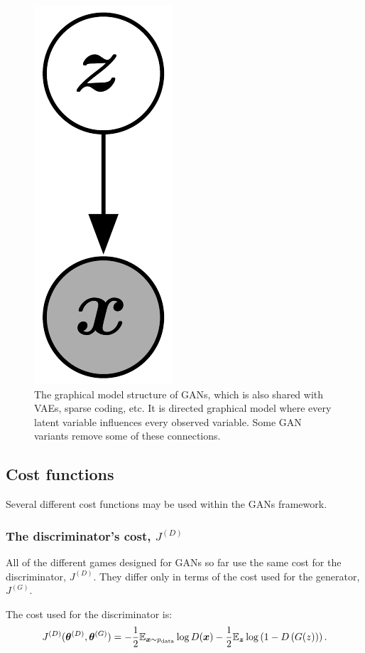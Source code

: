 \begin{figure}
  \centering
  \includegraphics{graph}
  \caption{The graphical model structure of GANs, which is also shared with
    VAEs, sparse coding, etc.
    It is directed graphical model where every latent variable influences
    every observed variable.
    Some GAN variants remove some of these connections.
  }
  \label{fig:graph}
\end{figure}

\subsection{Cost functions}

Several different cost functions may be used within the GANs framework.

\subsubsection{The discriminator's cost, $J^{(D)}$}

All of the different games designed for GANs so far use the same cost for the
discriminator, $J^{(D)}$. They differ only in terms of the cost used for the
generator, $J^{(G)}$.

The cost used for the discriminator is:
\begin{equation}
  J^{(D)}({\bm{\theta}}^{(D)}, {\bm{\theta}}^{(G)}) = -\frac{1}{2} \mathbb{E}_{{\bm{x}} \sim p_{\rm{data}}} \log D({\bm{x}}) - \frac{1}{2} \mathbb{E}_{{\bm{z}}} \log \left(1 - D\left( G(z)\right) \right).
  \label{eq:discriminator_cost}
\end{equation}

